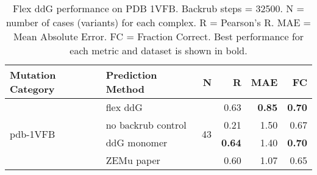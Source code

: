 \begin{table}
  \begin{tabular}{llrrrr}
\toprule
Mutation Category &   Prediction Method &   N &    R &  MAE &   FC \\
\midrule
 \multirow{ 4}{*}{pdb-1VFB} & flex ddG & \multirow{ 4}{*}{43} & 0.63 & \textbf{0.85} & \textbf{0.70}  \\
 & no backrub control & & 0.21 & 1.50 & 0.67  \\
 & ddG monomer & & \textbf{0.64} & 1.40 & \textbf{0.70}  \\
 & ZEMu paper & & 0.60 & 1.07 & 0.65  \\
\bottomrule
\end{tabular}
  \caption[Flex ddG performance on PDB 1VFB]{
    Flex ddG performance on PDB 1VFB. Backrub steps = 32500. N = number of cases (variants) for each complex. R = Pearson's R. MAE = Mean Absolute Error. FC = Fraction Correct. Best performance for each metric and dataset is shown in bold.
  } \label{tab:table-pdb-1VFB}
\end{table}
